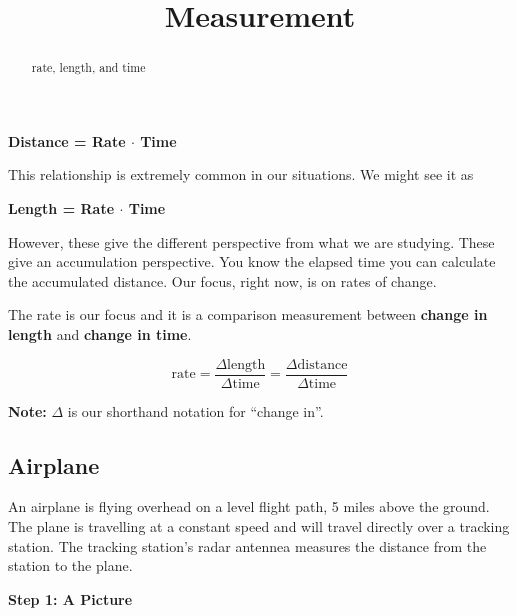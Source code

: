 \documentclass{ximera}
\title{Measurement}
\begin{document}
\begin{abstract}
rate, length, and time
\end{abstract}
\maketitle




\begin{center}
\textbf{\textcolor{purple!85!blue}{Distance = Rate $\cdot$ Time}} 
\end{center}

This relationship is extremely common in our situations.  We might see it as



\begin{center}
\textbf{\textcolor{purple!85!blue}{Length = Rate $\cdot$ Time}} 
\end{center}



However, these give the different perspective from what we are studying.  These give an accumulation perspective. You  know the elapsed time you can calculate the accumulated distance.  Our focus, right now, is on rates of change. 


The rate is our focus and it is a comparison measurement between \textbf{\textcolor{red!70!black}{change in length}} and \textbf{\textcolor{red!70!black}{change in time}}.



\[
\text{rate} = \frac{\Delta \text{length}}{\Delta \text{time}} = \frac{\Delta \text{distance}}{\Delta \text{time}}
\]

\textbf{Note:} $\Delta$ is our shorthand notation for ``change in''. 






\subsection*{Airplane}

An airplane is flying overhead on a level flight path, 5 miles above the ground.  The plane is travelling at a constant speed and will travel directly over a tracking station. The tracking station's radar antennea measures the distance from the station to the plane.






\textbf{\textcolor{purple!85!blue}{Step 1: A Picture}}
\end{document}
